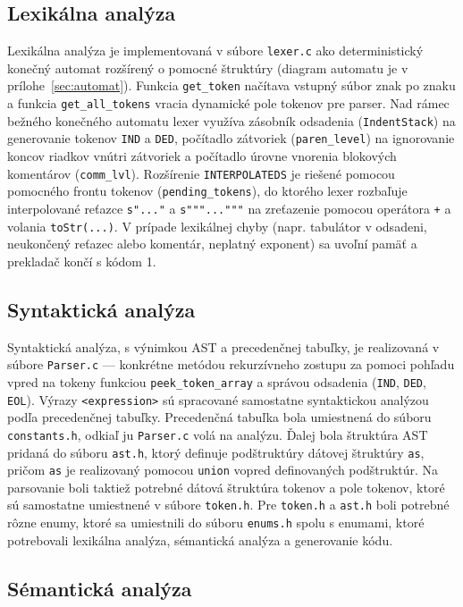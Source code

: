 \documentclass{article}
\begin{document}
    \subsection{Lexikálna analýza}
         Lexikálna analýza je implementovaná v súbore \texttt{lexer.c} ako deterministický konečný automat rozšírený o pomocné štruktúry (diagram automatu je v prílohe~\ref{sec:automat}). Funkcia \texttt{get\_token} načítava vstupný súbor znak po znaku a funkcia \texttt{get\_all\_tokens} vracia dynamické pole tokenov pre parser. Nad rámec bežného konečného automatu lexer využíva zásobník odsadenia (\texttt{IndentStack}) na generovanie tokenov \texttt{IND} a \texttt{DED}, počítadlo zátvoriek (\texttt{paren\_level}) na ignorovanie koncov riadkov vnútri zátvoriek a počítadlo úrovne vnorenia blokových komentárov (\texttt{comm\_lvl}). Rozšírenie \texttt{INTERPOLATEDS} je riešené pomocou pomocného frontu tokenov (\texttt{pending\_tokens}), do ktorého lexer rozbaľuje interpolované reťazce \texttt{s"..."} a \texttt{s"""..."""} na zreťazenie pomocou operátora \texttt{+} a volania \texttt{toStr(...)}. V prípade lexikálnej chyby (napr. tabulátor v odsadeni, neukončený reťazec alebo komentár, neplatný exponent) sa uvoľní pamäť a prekladač končí s kódom 1.
    \subsection{Syntaktická analýza}
         Syntaktická analýza, s výnimkou AST a precedenčnej tabuľky, je realizovaná v súbore \texttt{Parser.c} --- konkrétne metódou rekurzívneho zostupu za pomoci pohľadu vpred na tokeny funkciou \texttt{peek\_token\_array} a správou odsadenia (\texttt{IND}, \texttt{DED}, \texttt{EOL}). Výrazy \texttt{\textless expression\textgreater} sú spracované samostatne syntaktickou analýzou podľa precedenčnej tabuľky. Precedenčná tabuľka bola umiestnená do súboru \texttt{constants.h}, odkiaľ ju \texttt{Parser.c} volá na analýzu. Ďalej bola štruktúra AST pridaná do súboru \texttt{ast.h}, ktorý definuje podštruktúry dátovej štruktúry \texttt{as}, pričom \texttt{as} je realizovaný pomocou \texttt{union} vopred definovaných podštruktúr. Na parsovanie boli taktiež potrebné dátová štruktúra tokenov a pole tokenov, ktoré sú samostatne umiestnené v súbore \texttt{token.h}. Pre \texttt{token.h} a \texttt{ast.h} boli potrebné rôzne enumy, ktoré sa umiestnili do súboru \texttt{enums.h} spolu s enumami, ktoré potrebovali lexikálna analýza, sémantická analýza a generovanie kódu.
    \subsection{Sémantická analýza}
\end{document}
